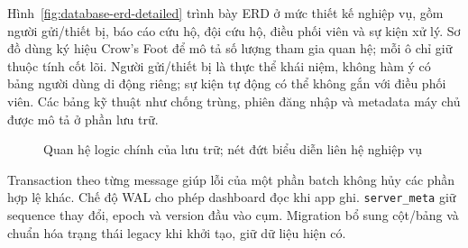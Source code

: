 Hình~\ref{fig:database-erd-detailed} trình bày ERD ở mức thiết kế nghiệp vụ, gồm người gửi/thiết bị, báo cáo cứu hộ, đội cứu hộ, điều phối viên và sự kiện xử lý. Sơ đồ dùng ký hiệu Crow's Foot để mô tả số lượng tham gia quan hệ; mỗi ô chỉ giữ thuộc tính cốt lõi. Người gửi/thiết bị là thực thể khái niệm, không hàm ý có bảng người dùng di động riêng; sự kiện tự động có thể không gắn với điều phối viên. Các bảng kỹ thuật như chống trùng, phiên đăng nhập và metadata máy chủ được mô tả ở phần lưu trữ.

\begin{figure}[htbp]
\centering
{}
\caption{Quan hệ logic chính của lưu trữ; nét đứt biểu diễn liên hệ nghiệp vụ}
\label{fig:data-relations}
\end{figure}

Transaction theo từng message giúp lỗi của một phần batch không hủy các phần hợp lệ khác. Chế độ WAL cho phép dashboard đọc khi app ghi. \texttt{server\_meta} giữ sequence thay đổi, epoch và version đầu vào cụm. Migration bổ sung cột/bảng và chuẩn hóa trạng thái legacy khi khởi tạo, giữ dữ liệu hiện có.

